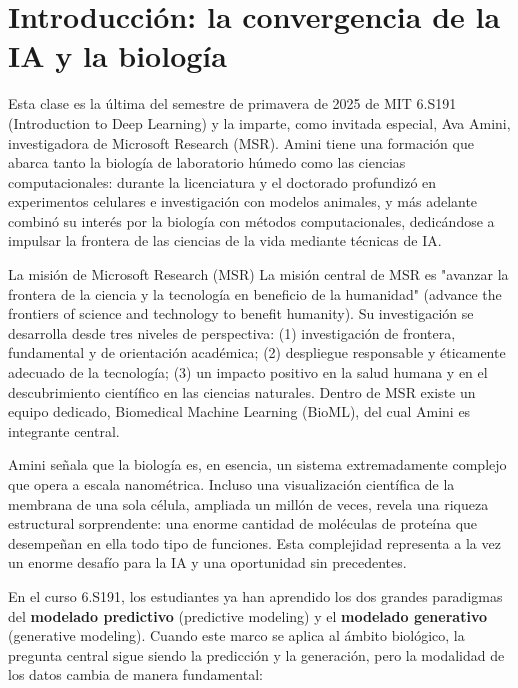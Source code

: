 \section{Introducción: la convergencia de la IA y la biología}

Esta clase es la última del semestre de primavera de 2025 de MIT 6.S191 (Introduction to Deep Learning) y la imparte, como invitada especial, Ava Amini, investigadora de Microsoft Research (MSR). Amini tiene una formación que abarca tanto la biología de laboratorio húmedo como las ciencias computacionales: durante la licenciatura y el doctorado profundizó en experimentos celulares e investigación con modelos animales, y más adelante combinó su interés por la biología con métodos computacionales, dedicándose a impulsar la frontera de las ciencias de la vida mediante técnicas de IA.

\begin{knowledgebox}{La misión de Microsoft Research (MSR)}
La misión central de MSR es "avanzar la frontera de la ciencia y la tecnología en beneficio de la humanidad" (advance the frontiers of science and technology to benefit humanity). Su investigación se desarrolla desde tres niveles de perspectiva: (1) investigación de frontera, fundamental y de orientación académica; (2) despliegue responsable y éticamente adecuado de la tecnología; (3) un impacto positivo en la salud humana y en el descubrimiento científico en las ciencias naturales. Dentro de MSR existe un equipo dedicado, Biomedical Machine Learning (BioML), del cual Amini es integrante central.
\end{knowledgebox}

Amini señala que la biología es, en esencia, un sistema extremadamente complejo que opera a escala nanométrica. Incluso una visualización científica de la membrana de una sola célula, ampliada un millón de veces, revela una riqueza estructural sorprendente: una enorme cantidad de moléculas de proteína que desempeñan en ella todo tipo de funciones. Esta complejidad representa a la vez un enorme desafío para la IA y una oportunidad sin precedentes.

En el curso 6.S191, los estudiantes ya han aprendido los dos grandes paradigmas del \textbf{modelado predictivo} (predictive modeling) y el \textbf{modelado generativo} (generative modeling). Cuando este marco se aplica al ámbito biológico, la pregunta central sigue siendo la predicción y la generación, pero la modalidad de los datos cambia de manera fundamental:

